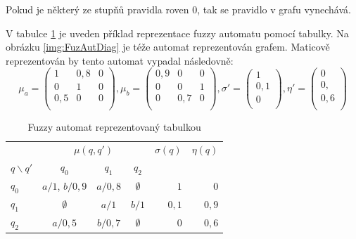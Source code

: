 Pokud je některý ze stupňů pravidla roven $0$, tak se pravidlo v grafu vynechává.

\begin{example} \label{ex:FuzAut}
  V tabulce \ref{tab:FuzAutTab} je uveden příklad reprezentace fuzzy automatu pomocí tabulky. Na obrázku \ref{img:FuzAutDiag} je téže automat reprezentován grafem. Maticově reprezentován by tento automat vypadal následovně:
  $$
  \mu_a = 
    \begin{pmatrix}
     1 		& 0{,}8 	& 0 \\
     0 		& 1 		& 0 \\
     0{,}5 	& 0		& 0 \\
    \end{pmatrix},
  \mu_b = 
    \begin{pmatrix}
     0{,}9 	& 0	 	& 0 \\
     0 		& 0 		& 1 \\
     0	 	& 0{,}7		& 0 \\
    \end{pmatrix},
  \sigma' = 
    \begin{pmatrix}
     1 		\\
     0{,}1 	\\
     0		\\
    \end{pmatrix},
  \eta' = 
    \begin{pmatrix}
     0 		\\
     0{,} 	\\
     0{,}6	\\
    \end{pmatrix}
  $$
\end{example}

\begin{table}
 \centering
  \begin{tabular}{|l||c|c|c||r|r|}
    \hline
    ~			& \multicolumn{3}{c||}{$\mu(q, q')$} 			& $\sigma(q)$ 	& $\eta(q)$	\\
    $q \backslash q'$	& $q_0$ 		& $q_1$ 	& $q_2$ 	& ~  		& ~		\\ \hline \hline
    $q_0$ 		& $a/1$, $b/0{,}9$ 	& $a/0{,}8$ 	& $\emptyset$ 	& $1$ 		& $0$		\\ \hline
    $q_1$ 		& $\emptyset$ 		& $a/1$ 	& $b/1$ 	& $0{,}1$ 	& $0{,}9$	\\ \hline
    $q_2$ 		& $a/0{,}5$ 		& $b/0{,}7$ 	& $\emptyset$ 	& $0$ 		& $0{,}6$	\\ \hline
  \end{tabular}

 \caption{Fuzzy automat reprezentovaný tabulkou} \label{tab:FuzAutTab}
\end{table}

